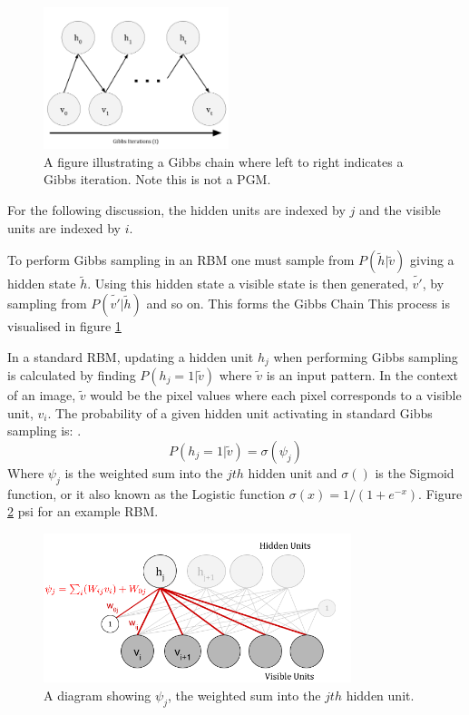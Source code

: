 \begin{figure}
  \begin{center}
    \includegraphics[width=0.48\textwidth]{Assets/Gibbs_Chain.png}
  \end{center}
  \caption{A figure illustrating a Gibbs chain where left to right indicates a Gibbs iteration. Note this is not a PGM.}
  \label{F:Gibbs_Chain}
\end{figure}

For the following discussion, the hidden units are indexed by $j$ and the visible units are indexed by $i$.

To perform Gibbs sampling in an RBM one must sample from $P(\tilde{h}|\tilde{v})$ giving a hidden state $\tilde{h}$. Using this hidden state a visible state is then generated, $\tilde{v'}$, by sampling from $P(\tilde{v'}|\tilde{h})$ and so on. This forms the Gibbs Chain  This process is visualised in figure \ref{F:Gibbs_Chain}

In a standard RBM, updating a hidden unit $h_j$ when performing Gibbs sampling is calculated by finding $ P(h_j = 1 | \tilde{v}) $ where $\tilde{v}$ is an input pattern. In the context of an image, $ \tilde{v} $ would be the pixel values where each pixel corresponds to a visible unit, $v_i$.
The probability of a given hidden unit activating in standard Gibbs sampling is: .
$$
P(h_j = 1 | \tilde{v}) = \sigma(\psi_j)
$$
Where $\psi_j$ is the weighted sum into the $jth$ hidden unit and $\sigma()$ is the Sigmoid function, or it also known as the Logistic function $\sigma(x)=1/(1+e^{-x})$. Figure \ref{F:PSI}  psi for an example RBM.

\begin{figure}[h]
\begin{center}
  \includegraphics[width = 0.8\textwidth]{Assets/PSI_and_PHI.png}
\caption{A diagram showing $\psi_j$, the weighted sum into the $jth$ hidden unit.}
\label{F:PSI}
\end{center}
\end{figure}

